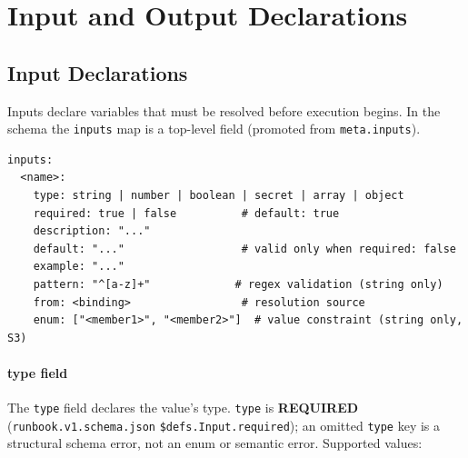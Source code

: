 \section{Input and Output Declarations}
\label{sec:inputs-outputs}

\subsection{Input Declarations}
\label{subsec:inputs}

Inputs declare variables that must be resolved before execution begins.  In the schema
the \texttt{inputs} map is a top-level field (promoted from \texttt{meta.inputs}).

\begin{verbatim}
inputs:
  <name>:
    type: string | number | boolean | secret | array | object
    required: true | false          # default: true
    description: "..."
    default: "..."                  # valid only when required: false
    example: "..."
    pattern: "^[a-z]+"             # regex validation (string only)
    from: <binding>                 # resolution source
    enum: ["<member1>", "<member2>"]  # value constraint (string only, S3)
\end{verbatim}

\paragraph{type field}
\label{para:type-field}
The \texttt{type} field declares the value's type. \texttt{type} is
\textbf{REQUIRED} (\texttt{runbook.v1.schema.json} \texttt{\$defs.Input.required});
an omitted \texttt{type} key is a structural schema error, not an enum or
semantic error. Supported values:

